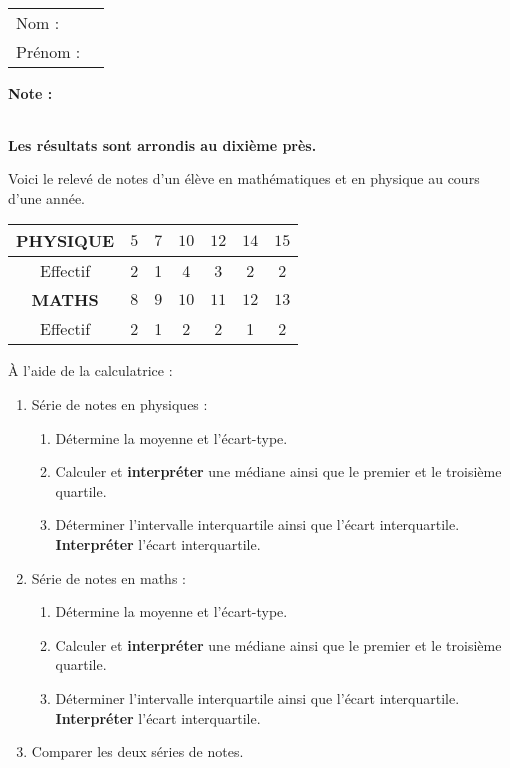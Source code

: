 \documentclass[10pt,french]{book}
\newcommand\competences{
\setcounter{exo}{0}
\begin{tabular}{ll} Nom : \\[5pt] Prénom : \end{tabular}
\hfill
\textbf{Note :}\renewcommand\arraystretch{2.3}
\begin{tabular}{|c|}
\hline
\slashbox{\Huge\bfseries\phantom{10}}{\Huge\bfseries 10}\\
\hline
\end{tabular}\renewcommand\arraystretch{1}\medskip
}
\begin{document}

\competences

\textbf{Les résultats sont arrondis au dixième près.}\par\medskip

\exo Voici le relevé de notes d'un élève en mathématiques et en physique au cours d'une année.

\begin{center}
\renewcommand\arraystretch{1.5}
	\begin{tabular}{|*{7}{c|}}
	\hline
		{\bf PHYSIQUE} & $5$ & $7$ & $10$ & $12$ & $14$ & $15$  \\
    \hline
        Effectif & 2 & 1 & 4 & 3 & 2 & 2 \\
	\hline\hline
		{\bf MATHS} & $8$ & $9$ & $10$ & $11$ & $12$ & $13$ \\
	\hline
        Effectif & 2 & 1 & 2 & 2 & 1 & 2 \\
    \hline
	\end{tabular}
\end{center}

À l'aide de la calculatrice :
\begin{enumerate}
	\item Série de notes en physiques :
        \begin{enumerate}
            \item Détermine la moyenne et l'écart-type.
            \item Calculer et \textbf{interpréter} une médiane ainsi que le premier et le troisième quartile.
            \item Déterminer l'intervalle interquartile ainsi que l'écart interquartile. \textbf{Interpréter} l'écart interquartile.
        \end{enumerate}
    \item Série de notes en maths :
        \begin{enumerate}
            \item Détermine la moyenne et l'écart-type.
            \item Calculer et \textbf{interpréter} une médiane ainsi que le premier et le troisième quartile.
            \item Déterminer l'intervalle interquartile ainsi que l'écart interquartile. \textbf{Interpréter} l'écart interquartile.
        \end{enumerate}
    \item Comparer les deux séries de notes.
\end{enumerate}
\end{document}
